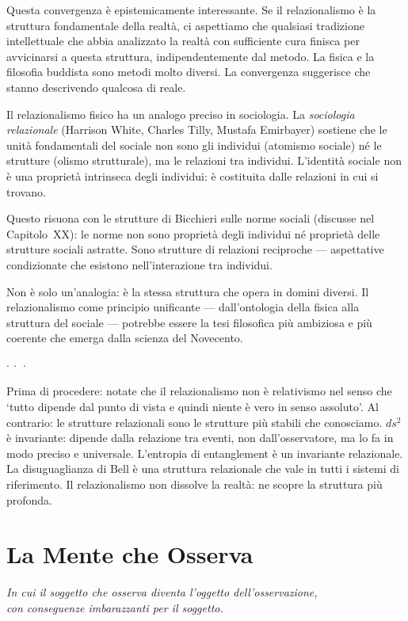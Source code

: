 \documentclass[12pt,a4paper,openany]{book}
\newcommand{\sezione}[1]{\vspace{1.2em}{\large\bfseries #1}\vspace{0.5em}\par}
\newcommand{\puntini}{\begin{center}$\cdot\ \cdot\ \cdot$\end{center}\vspace{0.3em}}
\begin{document}
Questa convergenza è epistemicamente interessante. Se il relazionalismo è la struttura fondamentale della realtà, ci aspettiamo che qualsiasi tradizione intellettuale che abbia analizzato la realtà con sufficiente cura finisca per avvicinarsi a questa struttura, indipendentemente dal metodo. La fisica e la filosofia buddista sono metodi molto diversi. La convergenza suggerisce che stanno descrivendo qualcosa di reale.

\sezione{Il relazionalismo e la struttura del sociale}

Il relazionalismo fisico ha un analogo preciso in sociologia. La \textit{sociologia relazionale} (Harrison White, Charles Tilly, Mustafa Emirbayer) sostiene che le unità fondamentali del sociale non sono gli individui (atomismo sociale) né le strutture (olismo strutturale), ma le relazioni tra individui. L'identità sociale non è una proprietà intrinseca degli individui: è costituita dalle relazioni in cui si trovano.

Questo risuona con le strutture di Bicchieri sulle norme sociali (discusse nel Capitolo~XX): le norme non sono proprietà degli individui né proprietà delle strutture sociali astratte. Sono strutture di relazioni reciproche --- aspettative condizionate che esistono nell'interazione tra individui.

Non è solo un'analogia: è la stessa struttura che opera in domini diversi. Il relazionalismo come principio unificante --- dall'ontologia della fisica alla struttura del sociale --- potrebbe essere la tesi filosofica più ambiziosa e più coerente che emerga dalla scienza del Novecento.

\puntini

Prima di procedere: notate che il relazionalismo non è relativismo nel senso che `tutto dipende dal punto di vista e quindi niente è vero in senso assoluto'. Al contrario: le strutture relazionali sono le strutture più stabili che conosciamo. $ds^2$ è invariante: dipende dalla relazione tra eventi, non dall'osservatore, ma lo fa in modo preciso e universale. L'entropia di entanglement è un invariante relazionale. La disuguaglianza di Bell è una struttura relazionale che vale in tutti i sistemi di riferimento. Il relazionalismo non dissolve la realtà: ne scopre la struttura più profonda.

\clearpage

\part{La Mente che Osserva}
\begin{center}
\itshape
In cui il soggetto che osserva diventa l'oggetto dell'osservazione,\\
con conseguenze imbarazzanti per il soggetto.
\end{center}
\clearpage
\end{document}
